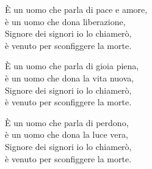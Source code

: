 
\strofa È un uomo che parla di pace e amore,\\
è un uomo che dona liberazione,\\
Signore dei signori io lo chiamerò,\\
è venuto per sconfiggere la morte.

\spazio

 

\spazio

\strofa È un uomo che parla di gioia piena,\\
è un uomo che dona la vita nuova,\\
Signore dei signori io lo chiamerò,\\
è venuto per sconfiggere la morte.

\spazio


\spazio

\strofa È un uomo che parla di perdono,\\
è un uomo che dona la luce vera,\\
Signore dei signori io lo chiamerò,\\
è venuto per sconfiggere la morte.

\spazio


